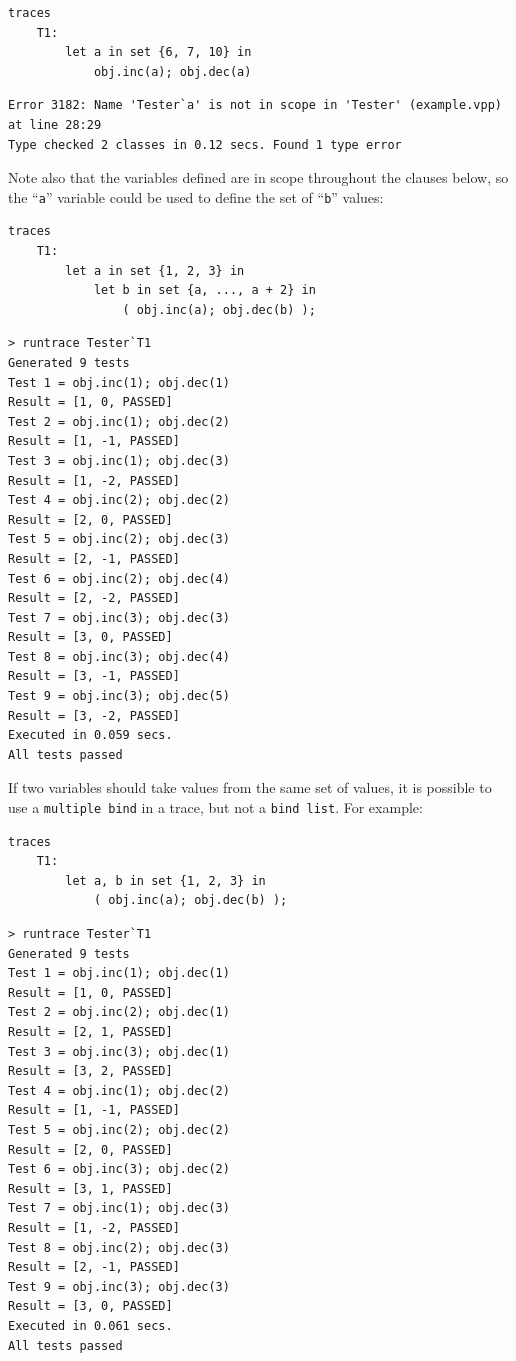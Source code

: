 \documentclass{overturerepchap}
\begin{document}
\small
\begin{lstlisting}
traces
    T1:
        let a in set {6, 7, 10} in
            obj.inc(a); obj.dec(a)
\end{lstlisting}
\scriptsize
\lstset{style=tool,language=}
\begin{lstlisting}[escapechar=@]
Error 3182: Name 'Tester`a' is not in scope in 'Tester' (example.vpp) at line 28:29
Type checked 2 classes in 0.12 secs. Found 1 type error
\end{lstlisting}
\lstset{style=mystyle}
\lstset{language=VDM++}
\normalsize

Note also that the variables defined are in scope
throughout the clauses below, so the ``\texttt{a}'' variable could be used to define the
set of ``\texttt{b}'' values:

\small
\begin{lstlisting}
traces
    T1:
        let a in set {1, 2, 3} in
            let b in set {a, ..., a + 2} in
                ( obj.inc(a); obj.dec(b) );
\end{lstlisting}

\lstset{style=tool,language=}
\begin{lstlisting}[escapechar=@]
> runtrace Tester`T1
Generated 9 tests
Test 1 = obj.inc(1); obj.dec(1)
Result = [1, 0, PASSED]
Test 2 = obj.inc(1); obj.dec(2)
Result = [1, -1, PASSED]
Test 3 = obj.inc(1); obj.dec(3)
Result = [1, -2, PASSED]
Test 4 = obj.inc(2); obj.dec(2)
Result = [2, 0, PASSED]
Test 5 = obj.inc(2); obj.dec(3)
Result = [2, -1, PASSED]
Test 6 = obj.inc(2); obj.dec(4)
Result = [2, -2, PASSED]
Test 7 = obj.inc(3); obj.dec(3)
Result = [3, 0, PASSED]
Test 8 = obj.inc(3); obj.dec(4)
Result = [3, -1, PASSED]
Test 9 = obj.inc(3); obj.dec(5)
Result = [3, -2, PASSED]
Executed in 0.059 secs. 
All tests passed
\end{lstlisting}
\lstset{style=mystyle}
\lstset{language=VDM++}
\normalsize

If two variables should take values from the same set of values, it is possible
to use a \texttt{multiple bind} in a trace, but not a \texttt{bind list}. For
example:

\small
\begin{lstlisting}
traces
    T1:
        let a, b in set {1, 2, 3} in
            ( obj.inc(a); obj.dec(b) );
\end{lstlisting}

\lstset{style=tool,language=}
\begin{lstlisting}[escapechar=@]
> runtrace Tester`T1
Generated 9 tests
Test 1 = obj.inc(1); obj.dec(1)
Result = [1, 0, PASSED]
Test 2 = obj.inc(2); obj.dec(1)
Result = [2, 1, PASSED]
Test 3 = obj.inc(3); obj.dec(1)
Result = [3, 2, PASSED]
Test 4 = obj.inc(1); obj.dec(2)
Result = [1, -1, PASSED]
Test 5 = obj.inc(2); obj.dec(2)
Result = [2, 0, PASSED]
Test 6 = obj.inc(3); obj.dec(2)
Result = [3, 1, PASSED]
Test 7 = obj.inc(1); obj.dec(3)
Result = [1, -2, PASSED]
Test 8 = obj.inc(2); obj.dec(3)
Result = [2, -1, PASSED]
Test 9 = obj.inc(3); obj.dec(3)
Result = [3, 0, PASSED]
Executed in 0.061 secs. 
All tests passed
\end{lstlisting}
\lstset{style=mystyle}
\lstset{language=VDM++}
\normalsize
\end{document}
